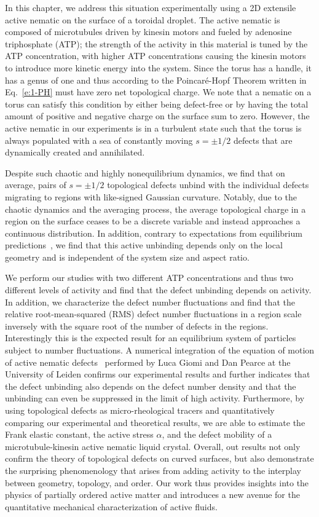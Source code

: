 In this chapter, we address this situation experimentally using a 2D extensile active nematic on the surface of a toroidal droplet.
The active nematic is composed of microtubules driven by kinesin motors and fueled by adenosine triphosphate (ATP); the strength of the activity in this material is tuned by the ATP concentration, with higher ATP concentrations causing the kinesin motors to introduce more kinetic energy into the system.
Since the torus has a handle, it has a genus of one and thus according to the Poincar\'e-Hopf Theorem written in Eq.~\ref{e:1-PH} must have zero net topological charge.
We note that a nematic on a torus can satisfy this condition by either being defect-free or by having the total amount of positive and negative charge on the surface sum to zero.
However, the active nematic in our experiments is in a turbulent state such that the torus is always populated with a sea of constantly moving $s = \pm 1/2$ defects that are dynamically created and annihilated.

Despite such chaotic and highly nonequilibrium dynamics, we find that on average, pairs of $s = \pm 1/2$ topological defects unbind with the individual defects migrating to regions with like-signed Gaussian curvature.
Notably, due to the chaotic dynamics and the averaging process, the average topological charge in a region on the surface ceases to be a discrete variable and instead approaches a continuous distribution.
In addition, contrary to expectations from equilibrium predictions~\cite{RN36,RN19,RN22,RN20,RN78}, we find that this active unbinding depends only on the local geometry and is independent of the system size and aspect ratio.

We perform our studies with two different ATP concentrations and thus two different levels of activity and find that the defect unbinding depends on activity.
In addition, we characterize the defect number fluctuations and find that the relative root-mean-squared (RMS) defect number fluctuations in a region scale inversely with the square root of the number of defects in the regions.
Interestingly this is the expected result for an equilibrium system of particles subject to number fluctuations.
A numerical integration of the equation of motion of active nematic defects~\cite{RN11,RN8,RN9} performed by Luca Giomi and Dan Pearce at the University of Leiden confirms our experimental results and further indicates that the defect unbinding also depends on the defect number density and that the unbinding can even be suppressed in the limit of high activity.
Furthermore, by using topological defects as micro-rheological tracers and quantitatively comparing our experimental and theoretical results, we are able to estimate the Frank elastic constant, the active stress $\alpha$, and the defect mobility of a microtubule-kinesin active nematic liquid crystal.
Overall, out results not only confirm the theory of topological defects on curved surfaces, but also demonstrate the surprising phenomenology that arises from adding activity to the interplay between geometry, topology, and order.
Our work thus provides insights into the physics of partially ordered active matter and introduces a new avenue for the quantitative mechanical characterization of active fluids.


